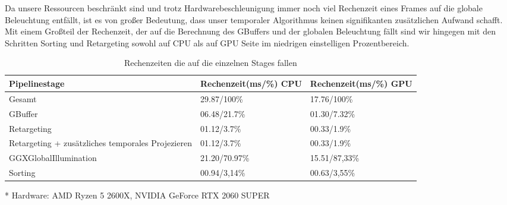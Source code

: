 Da unsere Ressourcen beschränkt sind und trotz Hardwarebeschleunigung immer noch viel Rechenzeit eines Frames auf die globale Beleuchtung entfällt,
ist es von großer Bedeutung, dass unser temporaler Algorithmus keinen signifikanten zusätzlichen Aufwand schafft.
Mit einem Großteil der Rechenzeit, der auf die Berechnung des GBuffers und der globalen Beleuchtung fällt sind wir hingegen 
mit den Schritten Sorting und Retargeting sowohl auf  CPU als auf GPU Seite im niedrigen einstelligen Prozentbereich.

\begin{center}
    \begin{table}[H]
        \begin{tabular}{ | p{4cm} | p{5cm} |l |}
        \hline
        \textbf{Pipelinestage}                              &  \textbf{Rechenzeit(ms/\%)} CPU & \textbf{Rechenzeit(ms/\%)} GPU \\ \hline
        Gesamt                                              &  29.87/100\%                    & 17.76/100\%\\ \hline
        GBuffer                                             &  06.48/21.7\%                   & 01.30/7.32\%\\ \hline
        Retargeting                                         &  01.12/3.7\%                    & 00.33/1.9\%\\ \hline
        Retargeting + zusätzliches temporales Projezieren   &  01.12/3.7\%                    & 00.33/1.9\%\\ \hline
        GGXGlobalIllumination                               &  21.20/70.97\%                  & 15.51/87,33\%\\ \hline
        Sorting                                             &  00.94/3,14\%                   & 00.63/3,55\%\\ \hline
        \hline
        \end{tabular}
        \caption{Rechenzeiten die auf die einzelnen Stages fallen}
        \medskip
        \small
        * Hardware: AMD Ryzen 5 2600X, NVIDIA GeForce RTX 2060 SUPER
    \end{table}
\end{center}